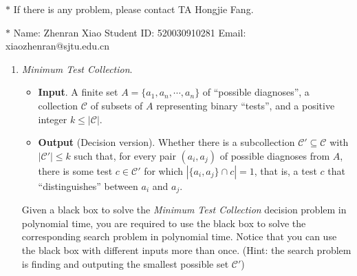 \documentclass[12pt,a4paper]{article}
\theoremstyle{definition}
\begin{document}
\noindent

\noindent{}
\begin{center}
\footnotesize{\color{red}$*$ If there is any problem, please contact TA Hongjie Fang.}

\footnotesize{\color{blue}$*$ Name: Zhenran Xiao  \quad Student ID: 520030910281 \quad Email: xiaozhenran@sjtu.edu.cn}
\end{center}

\begin{enumerate}
	\item \textit{Minimum Test Collection}.
	\begin{itemize} 
		\item \textbf{Input}. A finite set $A=\{a_1,a_n,\cdots,a_n\}$ of ``possible diagnoses'', a collection $\mathcal{C}$ of subsets of $A$ representing binary ``tests'', and a positive integer $k\leq \left|\mathcal{C}\right|$. 
		\item \textbf{Output} (Decision version). Whether there is a subcollection $\mathcal{C}'\subseteq\mathcal{C}$ with $\left|\mathcal{C}'\right|\leq k$ such that, for every pair $(a_i, a_j)$ of possible diagnoses from $A$, there is some test $c\in \mathcal{C}'$ for which $\left|\{a_i, a_j\}\cap c\right| = 1$, that is, a test $c$ that ``distinguishes'' between $a_i$ and $a_j$.
	\end{itemize}
	Given a black box to solve the \textit{Minimum Test Collection} decision problem in polynomial time, you are required to use the black box to solve the corresponding search problem in polynomial time. Notice that you can use the black box with different inputs more than once.
	{\color{blue}(Hint: the search problem is finding and outputing the smallest possible set $\mathcal{C}'$)}


\end{enumerate}
\end{document}
